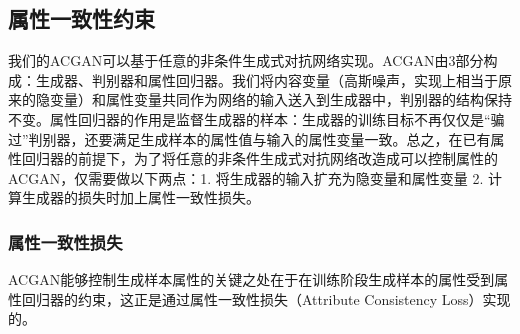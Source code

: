 \subsection{属性一致性约束}
我们的ACGAN可以基于任意的非条件生成式对抗网络实现。ACGAN由3部分构成：生成器、判别器和属性回归器。我们将内容变量（高斯噪声，实现上相当于原来的隐变量）和属性变量共同作为网络的输入送入到生成器中，判别器的结构保持不变。属性回归器的作用是监督生成器的样本：生成器的训练目标不再仅仅是“骗过”判别器，还要满足生成样本的属性值与输入的属性变量一致。总之，在已有属性回归器的前提下，为了将任意的非条件生成式对抗网络改造成可以控制属性的ACGAN，仅需要做以下两点：1. 将生成器的输入扩充为隐变量和属性变量 2. 计算生成器的损失时加上属性一致性损失。

\subsubsection{属性一致性损失}
ACGAN能够控制生成样本属性的关键之处在于在训练阶段生成样本的属性受到属性回归器的约束，这正是通过属性一致性损失（Attribute Consistency Loss）实现的。

